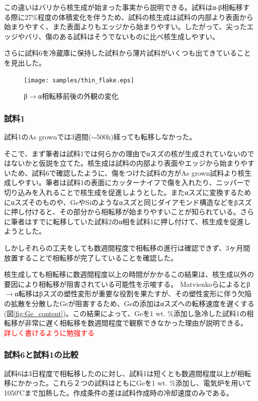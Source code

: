 この違いはバリから核生成が始まった事実から説明できる。試料はα-β相転移する際に27\%程度の体積変化を伴うため、試料の核生成は試料の内部より表面から始まりやすく、また表面よりもエッジから始まりやすい\cite{Cornelius}。したがって、尖ったエッジやバリ、傷のある試料はそうでないものに比べ核生成しやすい。

さらに試料6を冷蔵庫に保持した試料から薄片試料がいくつも出てきていることを見出した。
\begin{figure}[!h]
    \begin{center}
   \texttt{[image: samples/thin\_flake.eps]}
  \end{center}
  \caption{β$\to$α相転移前後の外観の変化}
  \label{fig:thin_flake}
\end{figure}


\subsubsection{試料1}
試料1のAs grownでは3週間($\sim$500h)経っても転移しなかった。

そこで、まず筆者は試料1では何らかの理由でαスズの核が生成されていないのではないかと仮説を立てた。核生成は試料の内部より表面やエッジから始まりやすい\cite{Cornelius}ため、試料6で確認したように、傷をつけた試料の方がAs grown試料より核生成しやすい。筆者は試料1の表面にカッターナイフで傷を入れたり、ニッパーで切り込みを入れることで核生成を促進しようとした。またαスズに変換するためにαスズそのものや、GeやSiのようなαスズと同じダイアモンド構造などをβスズに押し付けると、その部分から相転移が始まりやすいことが知られている\cite{Cornelius}。さらに筆者はすでに転移していた試料2のα相を試料1に押し付けて、核生成を促進しようとした。

しかしそれらの工夫をしても数週間程度で相転移の進行は確認できず、3ヶ月間放置することで相転移が完了していることを確認した。

核生成しても相転移に数週間程度以上の時間がかかるこの結果は、核生成以外の要因により相転移が阻害されている可能性を示唆する。
Matvienkoら\cite{Matvienko}によるとβ$\to$α転移はβスズの塑性変形が重要な役割を果たすが、その塑性変形に伴う欠陥の拡散を分散したGeが阻害するため、Geの添加はαスズへの転移速度を遅くする(図\ref{fig:Ge_content})。この結果によって、Geを1 wt. \%添加し急冷した試料1の相転移が非常に遅く相転移を数週間程度で観察できなかった理由が説明できる。
\textcolor{red}{詳しく書けるように勉強する}

\subsubsection{試料6と試料1の比較}
試料6は3日程度で相転移したのに対し、試料1は短くとも数週間程度以上が相転移にかかった。これら２つの試料はともにGeを1 wt. \%添加し、電気炉を用いて1050℃まで加熱した。作成条件の差は試料作成時の冷却速度のみである。

